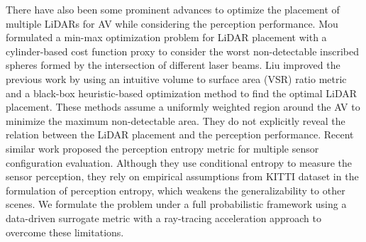 \documentclass[10pt,twocolumn,letterpaper]{article}
\begin{document}
There have also been some prominent advances to optimize the placement of multiple LiDARs for AV while considering the perception performance. Mou \etal \cite{mou2018optimal} formulated a min-max optimization problem for LiDAR placement with a cylinder-based cost function proxy to consider the worst non-detectable inscribed spheres formed by the intersection of different laser beams.
Liu \etal \cite{liu2019should} improved the previous work by using an intuitive volume to surface area (VSR) ratio metric and a black-box heuristic-based optimization method to find the optimal LiDAR placement. These methods assume a uniformly weighted region around the AV to minimize the maximum non-detectable area. They do not explicitly reveal the relation between the LiDAR placement and the perception performance. Recent similar work \cite{ma2021perception} proposed the perception entropy metric for multiple sensor configuration evaluation. Although they use conditional entropy to measure the sensor perception, they rely on empirical assumptions from KITTI dataset in the formulation of perception entropy, which weakens the generalizability to other scenes. We formulate the problem under a full probabilistic framework using a data-driven surrogate metric with a ray-tracing acceleration approach to overcome these limitations.



\end{document}
